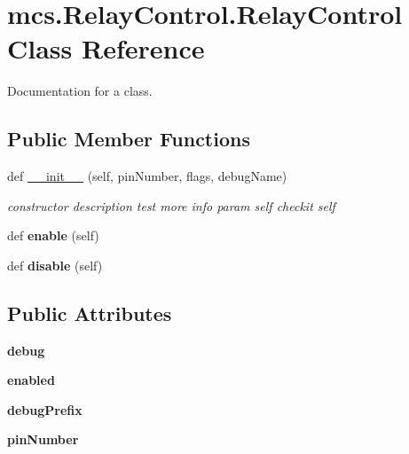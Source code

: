 \hypertarget{classmcs_1_1RelayControl_1_1RelayControl}{}\section{mcs.\+Relay\+Control.\+Relay\+Control Class Reference}
\label{classmcs_1_1RelayControl_1_1RelayControl}


Documentation for a class.  


\subsection*{Public Member Functions}
\begin{DoxyCompactItemize}
\item 
\mbox{\label{classmcs_1_1RelayControl_1_1RelayControl_ab18b64857da9079839839689657f6db3}} 
def \hyperlink{classmcs_1_1RelayControl_1_1RelayControl_ab18b64857da9079839839689657f6db3}{\+\_\+\+\_\+init\+\_\+\+\_\+} (self, pin\+Number, flags, debug\+Name)
\begin{DoxyCompactList}\small\item\em constructor description test more info param self checkit self \end{DoxyCompactList}\item 
\mbox{\label{classmcs_1_1RelayControl_1_1RelayControl_a498cf3f8db48d317ed877d65b56ba816}} 
def {\bfseries enable} (self)
\item 
\mbox{\label{classmcs_1_1RelayControl_1_1RelayControl_a55b67821e961b9e74634ac1682f94467}} 
def {\bfseries disable} (self)
\end{DoxyCompactItemize}
\subsection*{Public Attributes}
\begin{DoxyCompactItemize}
\item 
\mbox{\label{classmcs_1_1RelayControl_1_1RelayControl_ac414ee56268760762462fcc269f5bb9e}} 
{\bfseries debug}
\item 
\mbox{\label{classmcs_1_1RelayControl_1_1RelayControl_a2b986e4958b1050251e30be8c966ea0a}} 
{\bfseries enabled}
\item 
\mbox{\label{classmcs_1_1RelayControl_1_1RelayControl_a0cf46c1eb6fe793ed603a389b486e3e1}} 
{\bfseries debug\+Prefix}
\item 
\mbox{\label{classmcs_1_1RelayControl_1_1RelayControl_a706f3b832dfe42ad0e5784370f3d0858}} 
{\bfseries pin\+Number}
\end{DoxyCompactItemize}


